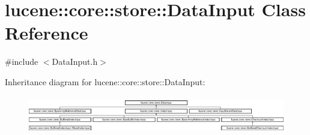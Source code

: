 \hypertarget{classlucene_1_1core_1_1store_1_1DataInput}{}\section{lucene\+:\+:core\+:\+:store\+:\+:Data\+Input Class Reference}
\label{classlucene_1_1core_1_1store_1_1DataInput}


{\ttfamily \#include $<$Data\+Input.\+h$>$}

Inheritance diagram for lucene\+:\+:core\+:\+:store\+:\+:Data\+Input\+:\begin{figure}[H]
\begin{center}
\leavevmode
\includegraphics[height=1.676647cm]{classlucene_1_1core_1_1store_1_1DataInput}
\end{center}
\end{figure}
